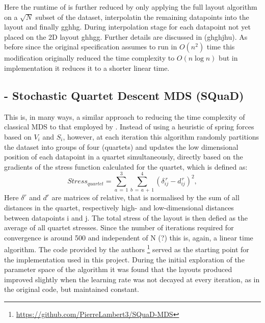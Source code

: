 \documentclass{l4proj}
\begin{document}
Here the runtime of \citet{Chalmers96} is further reduced by only applying the full layout algorithm on a $\sqrt{N}$ subset of the dataset, interpolatin the remaining datapoints into the layout and finally gghhg. During interpolation stage for each datapoint not yet placed on the 2D layout ghhgg. Further details are discussed in (ghghjhu). As before since the original specification \citep{Chalmers96} assumes to run in $O(n^2)$ time this modification originally reduced the time complexity to $O(n\log n)$ but in \citet{2019} implementation it reduces it to a shorter linear time.

\subsection{\cite{squad} - Stochastic Quartet Descent MDS (SQuaD)}

This is, in many ways, a similar approach to reducing the time complexity of classical MDS to that employed by \citet{Chalmers96}. Instead of using a heuristic of spring forces based on $V_i$ and $S_i$, however, at each iteration this algorithm randomly partitions the dataset into groups of four (quartets) and updates the low dimensional position of each datapoint in a quartet simultaneously, directly based on the gradients of the stress function calculated for the quartet, which is defined as:
\begin{equation}
\label{tab:quartet_stress}
    Stress_{quartet} = \sum_{a\, =\, 1}^{3} \sum_{b\, =\, a\, +\, 1}^{4} (\delta_{ij}^{\,r} - d_{ij}^{\,r})^2,
\end{equation} 
Here $\delta^{r}$ and $d^{r}$ are matrices of relative, that is normalised by the sum of all distances in the quartet, respectively high- and low-dimensional distances between datapoints i and j. The total stress of the layout is then defied as the average of all quartet stresses. Since the number of iterations required for convergence is around 500 and independent of N (?) this is, again, a linear time algorithm. The code provided by the authors \footnote{ \url{https://github.com/PierreLambert3/SQuaD-MDS}} served as the starting point for the implementation used in this project. During the initial exploration of the parameter space of the algorithm it was found that the layouts produced improved slightly when the learning rate was not decayed at every iteration, as in the original code, but maintained constant.


\end{document}
